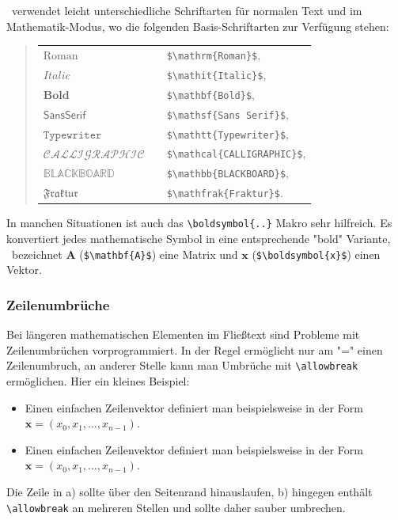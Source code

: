 \latex\ verwendet leicht unterschiedliche Schriftarten für normalen Text und im
Mathe\-matik-Modus, wo die folgenden Basis-Schriftarten zur Verfügung stehen:
%
\begin{quote}
    \begin{tabular}{lcl}
        $\mathrm{Roman}$      & & \verb!$\mathrm{Roman}$!,      \\
				$\mathit{Italic}$     & & \verb!$\mathit{Italic}$!,      \\
				$\mathbf{Bold}$     	& & \verb!$\mathbf{Bold}$!,      \\
        $\mathsf{Sans Serif}$ & & \verb!$\mathsf{Sans Serif}$!, \\
        $\mathtt{Typewriter}$ & & \verb!$\mathtt{Typewriter}$!, \\
				$\mathcal{CALLIGRAPHIC}$ & & \verb!$\mathcal{CALLIGRAPHIC}$!,\\
				$\mathbb{BLACKBOARD}$ & & \verb!$\mathbb{BLACKBOARD}$!,\\
				$\mathfrak{Fraktur}$ & & \verb!$\mathfrak{Fraktur}$!.
    \end{tabular}
\end{quote}
%
In manchen Situationen ist auch das \verb!\boldsymbol{..}! Makro sehr hilfreich. 
Es konvertiert jedes mathematische Symbol in eine entsprechende "bold" Variante,
\zB\ bezeichnet $\mathbf{A}$ (\verb!$\mathbf{A}$!) eine Matrix und $\boldsymbol{x}$ 
(\verb!$\boldsymbol{x}$!) einen Vektor.


\subsubsection{Zeilenumbrüche}

Bei längeren mathematischen Elementen im Fließtext sind Probleme mit
Zeilenumbrüchen vorprogrammiert. In der Regel ermöglicht \latex nur am "="
einen Zeilenumbruch, an anderer Stelle kann man Umbrüche mit
\verb|\allowbreak| ermöglichen. Hier ein kleines Beispiel:
%
\begin{itemize}
	\item[a)] Einen einfachen Zeilenvektor definiert man beispielsweise in der
	Form $\boldsymbol{x} = (x_0, x_1, \ldots, x_{n-1})$.
	\item[b)] Einen einfachen Zeilenvektor definiert man beispielsweise in der
	Form $\boldsymbol{x} = (x_0,\allowbreak x_1,\allowbreak\ldots,\allowbreak
	x_{n-1})$.
\end{itemize}
%
Die Zeile in a) sollte über den Seitenrand hinauslaufen, b) hingegen enthält
\verb|\allowbreak| an mehreren Stellen und sollte daher sauber umbrechen.


